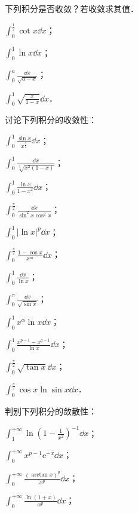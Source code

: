 \begin{xiti}
\item 下列积分是否收敛？若收敛求其值．
\begin{ziti}
\item $\displaystyle\int_{0}^{\frac{1}{2}}\cot x\dd x$；
\item $\displaystyle\int_{0}^{1}\ln x\dd x$；
\item $\displaystyle\int_{0}^{a}\frac{\dd x}{\sqrt{a-x}}$；
\item $\displaystyle\int_{0}^{1}\sqrt{\frac{x}{1-x}}\dd x$．
\end{ziti}
\item 讨论下列积分的收敛性：
\begin{ziti}
\item $\displaystyle\int_{0}^{1}\frac{\sin x}{x^{\frac{3}{2}}}\dd x$；
\item $\displaystyle\int_{0}^{1}\frac{\dd x}{\sqrt[3]{x^{2}(1-x)}}$；
\item $\displaystyle\int_{0}^{1}\frac{\ln x}{1-x^{2}}\dd x$；
\item $\displaystyle\int_{0}^{\frac{\pi}{2}}\frac{\dd x}{\sin^{2}x\cos^{2}x}$；
\item $\displaystyle\int_{0}^{1}\left|\ln x\right|^{p}\dd x$；
\item $\displaystyle\int_{0}^{\frac{\pi}{2}}\frac{1-\cos x}{x^{m}}\dd x$；
\item $\displaystyle\int_{0}^{1}\frac{\dd x}{\ln x}$；
\item $\displaystyle\int_{0}^{\pi}\frac{\dd x}{\sqrt{\sin x}}$；
\item $\displaystyle\int_{0}^{1}x^{\alpha}\ln x\dd x$；
\item $\displaystyle\int_{0}^{1}\frac{x^{p-1}-x^{q-1}}{\ln x}\dd x$；
\item $\displaystyle\int_{0}^{\frac{\pi}{2}}\sqrt{\tan x}\dd x$；
\item $\displaystyle\int_{0}^{\frac{\pi}{2}}\cos x\ln\sin x\dd x$．
\end{ziti}
\item 判别下列积分的敛散性：
\begin{ziti}
\item $\displaystyle\int_{1}^{+\infty}\ln\left(1-\frac{1}{x^{2}}\right)^{-1}\dd x$；
\item $\displaystyle\int_{0}^{+\infty}x^{p-1}\mathrm{e}^{-x}\dd x$；
\item $\displaystyle\int_{0}^{+\infty}\frac{\left(\arctan x\right)^{q}}{x^{p}}\dd x$；
\item $\displaystyle\int_{0}^{+\infty}\frac{\ln(1+x)}{x^{p}}\dd x$；

\end{ziti}
\end{xiti}
